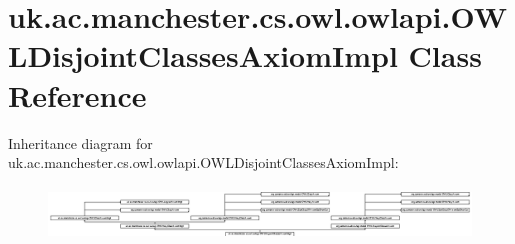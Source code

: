 \hypertarget{classuk_1_1ac_1_1manchester_1_1cs_1_1owl_1_1owlapi_1_1_o_w_l_disjoint_classes_axiom_impl}{\section{uk.\-ac.\-manchester.\-cs.\-owl.\-owlapi.\-O\-W\-L\-Disjoint\-Classes\-Axiom\-Impl Class Reference}
\label{classuk_1_1ac_1_1manchester_1_1cs_1_1owl_1_1owlapi_1_1_o_w_l_disjoint_classes_axiom_impl}
}
Inheritance diagram for uk.\-ac.\-manchester.\-cs.\-owl.\-owlapi.\-O\-W\-L\-Disjoint\-Classes\-Axiom\-Impl\-:\begin{figure}[H]
\begin{center}
\leavevmode
\includegraphics[height=1.428571cm]{classuk_1_1ac_1_1manchester_1_1cs_1_1owl_1_1owlapi_1_1_o_w_l_disjoint_classes_axiom_impl}
\end{center}
\end{figure}
